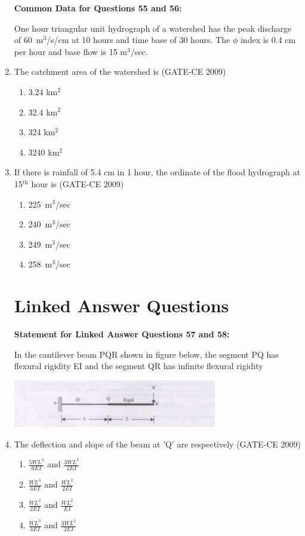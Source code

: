 \documentclass[12pt]{article}
\begin{document}
\begin{enumerate}[label=Q.\arabic*]
\textbf{Common Data for Questions 55 and 56:}

One hour triangular unit hydrograph of a watershed has the peak discharge of 60~m$^3$/s/cm at 10 hours and time base of 30 hours. The $\phi$ index is 0.4 cm per hour and base flow is 15 m$^3$/sec.

    \item The catchment area of the watershed is (GATE-CE 2009)
    \begin{enumerate}[label=(\Alph*)]
        \item 3.24 km$^2$ 
        \item 32.4 km$^2$ 
        \item 324 km$^2$ 
        \item 3240 km$^2$
    \end{enumerate}
    
    \item If there is rainfall of 5.4 cm in 1 hour, the ordinate of the flood hydrograph at 15$^\text{th}$ hour is (GATE-CE 2009)
    \begin{enumerate}[label=(\Alph*)]
        \item 225~m$^3$/sec 
        \item 240~m$^3$/sec 
        \item 249~m$^3$/sec 
        \item 258~m$^3$/sec
    \end{enumerate}

\section*{Linked Answer Questions}
\textbf{Statement for Linked Answer Questions 57 and 58:}

In the cantilever beam PQR shown in figure below, the segment PQ has flexural rigidity EI and the segment QR has infinite flexural rigidity
    \begin{center}
    \includegraphics[width=0.7\textwidth]{image6.jpg}
    \end{center}
    \item The deflection and slope of the beam at 'Q' are respectively (GATE-CE 2009)
    \begin{enumerate}[label=(\Alph*)]
        \item $\frac{5WL^3}{6EI}$ and $\frac{3WL^2}{2EI}$ 
        \item $\frac{WL^3}{3EI}$ and $\frac{WL^2}{2EI}$ 
        \item $\frac{WL^3}{2EI}$ and $\frac{WL^2}{EI}$ 
        \item $\frac{WL^3}{3EI}$ and $\frac{3WL^2}{2EI}$
    \end{enumerate}
    

\end{enumerate}
\end{document}
